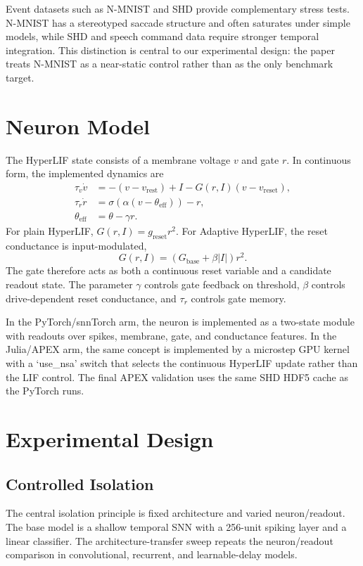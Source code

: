 \documentclass[journal]{IEEEtran}
\newcommand{\hlif}{HyperLIF}
\newcommand{\adhlif}{Adaptive HyperLIF}
\newcommand{\lif}{LIF}
\newcommand{\apex}{APEX}
\begin{document}
Event datasets such as N-MNIST \cite{Orchard2015NMNIST} and SHD \cite{Cramer2022SHD} provide complementary stress tests. N-MNIST has a stereotyped saccade structure and often saturates under simple models, while SHD and speech command data require stronger temporal integration. This distinction is central to our experimental design: the paper treats N-MNIST as a near-static control rather than as the only benchmark target.

\section{Neuron Model}
The \hlif{} state consists of a membrane voltage $v$ and gate $r$. In continuous form, the implemented dynamics are
\begin{align}
\tau_v \dot v &= -(v - v_{\mathrm{rest}}) + I - G(r, I)(v - v_{\mathrm{reset}}),\\
\tau_r \dot r &= \sigma\left(\alpha(v-\theta_{\mathrm{eff}})\right) - r,\\
\theta_{\mathrm{eff}} &= \theta - \gamma r.
\end{align}
For plain \hlif{}, $G(r,I)=g_{\mathrm{reset}}r^2$. For \adhlif{}, the reset conductance is input-modulated,
\begin{equation}
G(r,I) = \left(G_{\mathrm{base}} + \beta |I|\right)r^2.
\end{equation}
The gate therefore acts as both a continuous reset variable and a candidate readout state. The parameter $\gamma$ controls gate feedback on threshold, $\beta$ controls drive-dependent reset conductance, and $\tau_r$ controls gate memory.

In the PyTorch/snnTorch arm, the neuron is implemented as a two-state module with readouts over spikes, membrane, gate, and conductance features. In the Julia/\apex{} arm, the same concept is implemented by a microstep GPU kernel with a `use\_nsa' switch that selects the continuous \hlif{} update rather than the \lif{} control. The final \apex{} validation uses the same SHD HDF5 cache as the PyTorch runs.

\section{Experimental Design}
\subsection{Controlled Isolation}
The central isolation principle is fixed architecture and varied neuron/readout. The base model is a shallow temporal SNN with a 256-unit spiking layer and a linear classifier. The architecture-transfer sweep repeats the neuron/readout comparison in convolutional, recurrent, and learnable-delay models.
\end{document}
